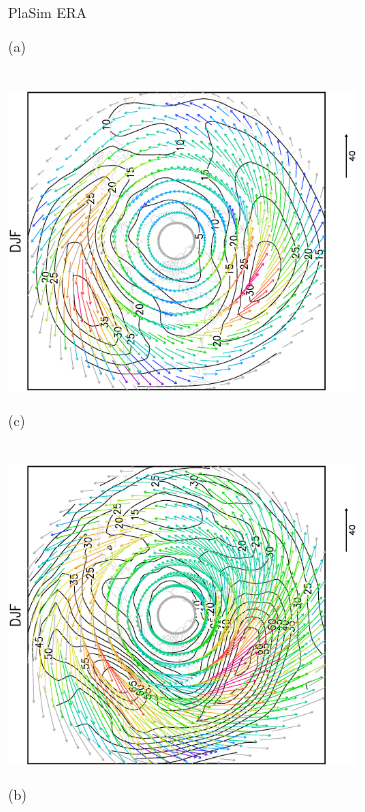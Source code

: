 \documentclass[12pt,a4paper,twoside,openright,headinclude,liststotoc,bibtotoc]{scrreprt}
\begin{document}
\begin{figure}[b]
\hspace{3.8cm}PlaSim \vspace{0.2cm} \hspace{7.3cm} ERA \\
\parbox{8.5cm}{\hspace{0.95cm}\begin{scriptsize}(a)\end{scriptsize} \vspace{-0.5cm} \\
\includegraphics[height=8.0cm,angle=-90]
{eps/north_DJF_PFLX_TMEAN1.eps}
}
\parbox{8.5cm}{\hspace{0.95cm}\begin{scriptsize}(c)\end{scriptsize} \vspace{-0.5cm} \\
\includegraphics[height=8.0cm,angle=-90]
{eps/dailyERA_north_DJF_PFLX_TMEAN.eps}
}
\parbox{8.5cm}{\hspace{0.95cm}\begin{scriptsize}(b)\end{scriptsize} \vspace{-0.5cm} \\
}
\end{figure}
\end{document}
